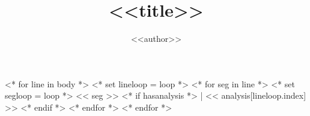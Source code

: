 \documentclass{article}
\title{<<title>>}
\author{<<author>>}
\begin{document}
\maketitle

<* for line in body *>
    <* set lineloop = loop *>
	<* for seg in line *>
	    <* set segloop = loop *>
		<< seg >> <* if hasanalysis *> | << analysis[lineloop.index] >> <* endif *>
    <* endfor *>
<* endfor *>
\end{document}
